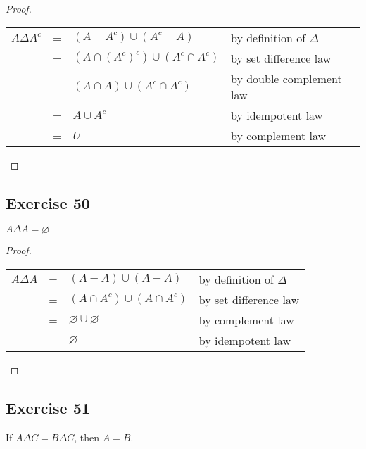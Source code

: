 \documentclass[14pt]{extarticle}
\newcommand{\es}{\varnothing}
\newcommand{\cy}{\color{cyan}}
\begin{document}
\begin{proof}
  \begin{center}
    \begin{tabular}{rcll}
      \(A \Delta A^c\) & = & \((A - A^c) \cup (A^c - A)\)             & {\cy by definition of $\Delta$} \\
                       & = & \((A \cap (A^c)^c) \cup (A^c \cap A^c)\) & {\cy by set difference law}     \\
                       & = & \((A \cap A) \cup (A^c \cap A^c)\)       & {\cy by double complement law}  \\
                       & = & \(A \cup A^c\)                           & {\cy by idempotent law}         \\
                       & = & \(U\)                                    & {\cy by complement law}
    \end{tabular}
  \end{center}
\end{proof}

\subsection{Exercise 50}
\(A \Delta A = \es\)

\begin{proof}
  \begin{center}
    \begin{tabular}{rcll}
      \(A \Delta A\) & = & \((A - A) \cup (A - A)\)           & {\cy by definition of $\Delta$} \\
                     & = & \((A \cap A^c) \cup (A \cap A^c)\) & {\cy by set difference law}     \\
                     & = & \(\es \cup \es\)                   & {\cy by complement law}         \\
                     & = & \(\es\)                            & {\cy by idempotent law}
    \end{tabular}
  \end{center}
\end{proof}

\subsection{Exercise 51}
If \(A \Delta C = B \Delta C\), then $A = B$.
\end{document}
